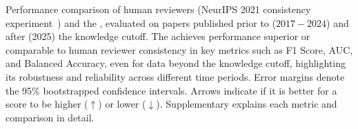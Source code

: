 \begin{table}[tbp]
    \centering
    \caption{
    Performance comparison of human reviewers (NeurIPS 2021 consistency experiment~\citep{beygelzimer2021neurips}) and the \ourreviewer, evaluated on papers published prior to ($2017 - 2024$) and after (2025) the knowledge cutoff.
    The \ourreviewer achieves performance superior or comparable to human reviewer consistency in key metrics such as F1 Score, AUC, and Balanced Accuracy, even for data beyond the knowledge cutoff, highlighting its robustness and reliability across different time periods.
    Error margins denote the 95\% bootstrapped confidence intervals.
    Arrows indicate if it is better for a score to be higher ($\uparrow$) or lower ($\downarrow$). Supplementary  explains each metric and comparison in detail.
    \label{tab:reviewers_main_paper}
    }


\end{table}
